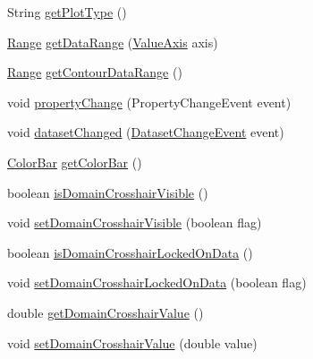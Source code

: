 \begin{DoxyCompactItemize}
\item 
String \mbox{\hyperlink{classorg_1_1jfree_1_1chart_1_1plot_1_1_contour_plot_aeadcde0d2f4d3a9edefb5e95b2fa7f13}{get\+Plot\+Type}} ()
\item 
\mbox{\hyperlink{classorg_1_1jfree_1_1data_1_1_range}{Range}} \mbox{\hyperlink{classorg_1_1jfree_1_1chart_1_1plot_1_1_contour_plot_af6342c1dfe5a7e570d22a3a039574ac5}{get\+Data\+Range}} (\mbox{\hyperlink{classorg_1_1jfree_1_1chart_1_1axis_1_1_value_axis}{Value\+Axis}} axis)
\item 
\mbox{\hyperlink{classorg_1_1jfree_1_1data_1_1_range}{Range}} \mbox{\hyperlink{classorg_1_1jfree_1_1chart_1_1plot_1_1_contour_plot_a4afe3f1b90d188371898a0075fa84ea7}{get\+Contour\+Data\+Range}} ()
\item 
void \mbox{\hyperlink{classorg_1_1jfree_1_1chart_1_1plot_1_1_contour_plot_a4bbf09d07cf48dec7c45ac713013510e}{property\+Change}} (Property\+Change\+Event event)
\item 
void \mbox{\hyperlink{classorg_1_1jfree_1_1chart_1_1plot_1_1_contour_plot_a40bc415932898100acb31d6bfc7b04fa}{dataset\+Changed}} (\mbox{\hyperlink{classorg_1_1jfree_1_1data_1_1general_1_1_dataset_change_event}{Dataset\+Change\+Event}} event)
\item 
\mbox{\hyperlink{classorg_1_1jfree_1_1chart_1_1axis_1_1_color_bar}{Color\+Bar}} \mbox{\hyperlink{classorg_1_1jfree_1_1chart_1_1plot_1_1_contour_plot_a9b7d367998f7347f968cf6ffeec6a7f2}{get\+Color\+Bar}} ()
\item 
boolean \mbox{\hyperlink{classorg_1_1jfree_1_1chart_1_1plot_1_1_contour_plot_afd2bb4f42aa1c1b5092f166749fbf7df}{is\+Domain\+Crosshair\+Visible}} ()
\item 
void \mbox{\hyperlink{classorg_1_1jfree_1_1chart_1_1plot_1_1_contour_plot_a1c5e5c3da5cedb8b85b73aaaad7dd0fe}{set\+Domain\+Crosshair\+Visible}} (boolean flag)
\item 
boolean \mbox{\hyperlink{classorg_1_1jfree_1_1chart_1_1plot_1_1_contour_plot_a117ca34ba6d4900cfadd006944b29475}{is\+Domain\+Crosshair\+Locked\+On\+Data}} ()
\item 
void \mbox{\hyperlink{classorg_1_1jfree_1_1chart_1_1plot_1_1_contour_plot_aa2c25a282ecd66b55e4420483bac346a}{set\+Domain\+Crosshair\+Locked\+On\+Data}} (boolean flag)
\item 
double \mbox{\hyperlink{classorg_1_1jfree_1_1chart_1_1plot_1_1_contour_plot_aba4f156c11935dbb775a8d78410256e4}{get\+Domain\+Crosshair\+Value}} ()
\item 
void \mbox{\hyperlink{classorg_1_1jfree_1_1chart_1_1plot_1_1_contour_plot_a312c906180718002f23fa3772d24cf5c}{set\+Domain\+Crosshair\+Value}} (double value)

\end{DoxyCompactItemize}
